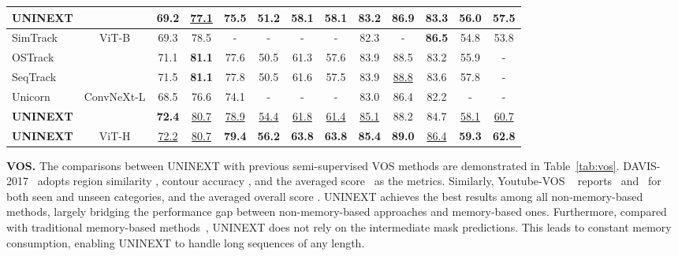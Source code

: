 \documentclass[10pt,twocolumn,letterpaper]{article}
\newcommand{\rankfirst}[1]{\textbf{#1}}
\newcommand{\ranksecond}[1]{\underline{#1}}
\newcommand{\mj}{}
\newcommand{\mf}{}
\newcommand{\mjf}{}
\newcommand{\mg}{}
\begin{document}
\begin{table*}[!t]
\begin{center}
{\begin{center}
{\begin{tabular}{l|c|ccc|ccc|ccc|cc}
\textbf{UNINEXT}  & &\rankfirst{69.2}&\ranksecond{77.1}&\rankfirst{75.5}&\rankfirst{51.2}&\rankfirst{58.1}&\rankfirst{58.1}&\rankfirst{83.2}&\rankfirst{86.9}&\rankfirst{83.3}&\rankfirst{56.0}&\rankfirst{57.5}\\
\hline
SimTrack~\cite{SimTrack}  &\multirow{3}{*}{ViT-B}&69.3&78.5&-&-&-&-&82.3&-&\rankfirst{86.5}&54.8&53.8\\
OSTrack~\cite{OSTrack} &  &
  71.1 &
  \rankfirst{81.1} &
  77.6 &
  50.5 &
  61.3 &
  57.6 &
  83.9 &
  88.5 &
  83.2 &
  55.9 &
  - \\ 
SeqTrack~\cite{SeqTrack} & &
71.5 & 
\rankfirst{81.1} &
77.8 &
50.5 &
61.6 &
57.5 &
83.9 &
\ranksecond{88.8} &
83.6 &
57.8 &
- \\
\hline
Unicorn~\cite{Unicorn}  &\multirow{2}{*}{ConvNeXt-L}&68.5&76.6&74.1&-&-&-&83.0&86.4&82.2&-&-\\
\textbf{UNINEXT}  & &\rankfirst{72.4}&\ranksecond{80.7}&\ranksecond{78.9}&\ranksecond{54.4}&\ranksecond{61.8}&\ranksecond{61.4}&\ranksecond{85.1}&88.2&84.7&\ranksecond{58.1}&\ranksecond{60.7}\\
\hline
\textbf{UNINEXT}  & ViT-H&\ranksecond{72.2}&\ranksecond{80.7}&\rankfirst{79.4}&\rankfirst{56.2}&\rankfirst{63.8}&\rankfirst{63.8}&\rankfirst{85.4}&\rankfirst{89.0}&\ranksecond{86.4}&\rankfirst{59.3}&\rankfirst{62.8}\\
\hline
 \end{tabular}}
\end{center}



%
 }
\end{center}
\end{table*}

\textbf{VOS.} The comparisons between UNINEXT with previous semi-supervised VOS methods are demonstrated in Table~\ref{tab:vos}. DAVIS-2017~\cite{DAVIS17} adopts region similarity \mj, contour accuracy \mf, and the averaged score \mjf\ as the metrics. Similarly, Youtube-VOS ~\cite{YoutubeVOS} reports \mj\ and \mf\ for both seen and unseen categories, and the averaged overall score \mg. UNINEXT achieves the best results among all non-memory-based methods, largely bridging the performance gap between non-memory-based approaches and memory-based ones. Furthermore, compared with traditional memory-based methods~\cite{STM, STCN}, UNINEXT does not rely on the intermediate mask predictions. This leads to constant memory consumption, enabling UNINEXT to handle long sequences of any length.  
\end{document}
